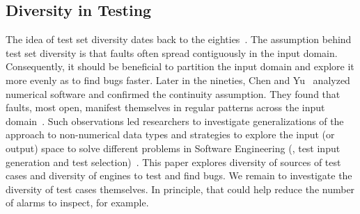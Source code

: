 \documentclass[sigconf,review, anonymous]{acmart}
\begin{document}
\subsection{Diversity in Testing}
The idea of test set diversity dates back to the
eighties~\cite{white-cohen-tse1980, ostrand-balcer-1988}. The
assumption behind test set diversity is that faults often spread
contiguously in the input domain. Consequently, it should be
beneficial to partition the input domain and explore it more evenly as
to find bugs faster. Later in the nineties, Chen and
Yu~\cite{chen-yu-tse1996} analyzed numerical software and confirmed
the continuity assumption. They found that faults, most open, manifest
themselves in regular patterns across the input
domain~\cite{Chen:2010:ART:1663656.1663914,7515474}.  Such
observations led researchers to investigate generalizations of the
approach to non-numerical data types and strategies to explore the
input (or output) space to solve different problems in Software
Engineering (\eg{}, test input generation and test
selection)~\cite{mayer-ase2005,bueno-etal-ase2007,ciupa-etal-icse08,alshahwan-harman-icse2012,alshahwan-harman-issta2014,7515474}. This
paper explores diversity of sources of test cases and diversity of
engines to test and find bugs. We remain to investigate the diversity
of test cases themselves. In principle, that could help reduce the
number of alarms to inspect, for example.
\end{document}
